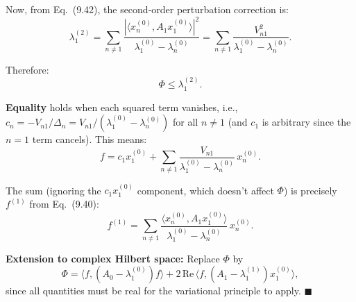 \documentclass[12pt]{article}
\begin{document}
Now, from Eq.~(9.42), the second-order perturbation correction is:
\[
\lambda_1^{(2)} = \sum_{n \neq 1} \frac{|\langle x_n^{(0)}, A_1 x_1^{(0)}\rangle|^2}{\lambda_1^{(0)} - \lambda_n^{(0)}} = \sum_{n \neq 1} \frac{V_{n1}^2}{\lambda_1^{(0)} - \lambda_n^{(0)}}.
\]

Therefore:
\[
\boxed{\Phi \le \lambda_1^{(2)}}.
\]

\textbf{Equality} holds when each squared term vanishes, i.e., $c_n = -V_{n1}/\Delta_n = V_{n1}/(\lambda_1^{(0)} - \lambda_n^{(0)})$ for all $n \neq 1$ (and $c_1$ is arbitrary since the $n=1$ term cancels). This means:
\[
f = c_1 x_1^{(0)} + \sum_{n \neq 1} \frac{V_{n1}}{\lambda_1^{(0)} - \lambda_n^{(0)}}\,x_n^{(0)}.
\]

The sum (ignoring the $c_1 x_1^{(0)}$ component, which doesn't affect $\Phi$) is precisely $f^{(1)}$ from Eq.~(9.40):
\[
f^{(1)} = \sum_{n \neq 1} \frac{\langle x_n^{(0)}, A_1 x_1^{(0)}\rangle}{\lambda_1^{(0)} - \lambda_n^{(0)}}\,x_n^{(0)}.
\]

\textbf{Extension to complex Hilbert space:} Replace $\Phi$ by
\[
\Phi = \langle f, (A_0 - \lambda_1^{(0)})f\rangle + 2\,\text{Re}\,\langle f, (A_1 - \lambda_1^{(1)})x_1^{(0)}\rangle,
\]
since all quantities must be real for the variational principle to apply. \hfill $\blacksquare$
\end{document}

